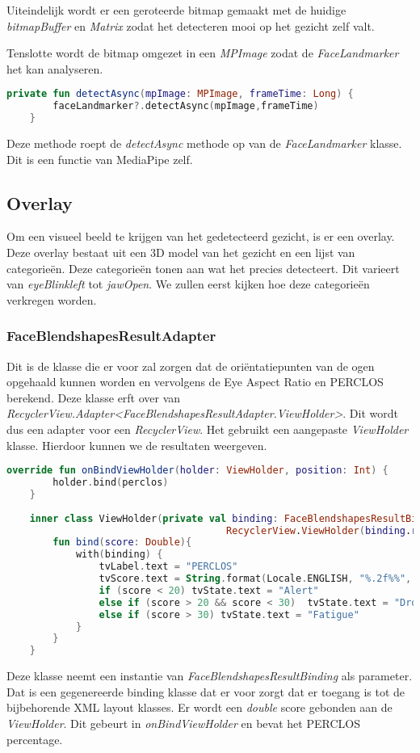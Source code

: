 Uiteindelijk wordt er een geroteerde bitmap gemaakt met de huidige \emph{bitmapBuffer} en \emph{Matrix} zodat het detecteren mooi op het gezicht zelf valt.

Tenslotte wordt de bitmap omgezet in een \emph{MPImage} zodat de \emph{FaceLandmarker} het kan analyseren.

\begin{lstlisting}[language=Kotlin, caption=detectAsync in FaceLandmarkerHelper.kt, label={lst:detectAsync}]
    private fun detectAsync(mpImage: MPImage, frameTime: Long) {
        faceLandmarker?.detectAsync(mpImage,frameTime)
    }
\end{lstlisting}
Deze methode roept de \emph{detectAsync} methode op van de \emph{FaceLandmarker} klasse. Dit is een functie van MediaPipe zelf.

\subsection{Overlay}
Om een visueel beeld te krijgen van het gedetecteerd gezicht, is er een overlay. Deze overlay bestaat uit een 3D model van het gezicht en een lijst van categorieën. Deze categorieën tonen aan wat het precies detecteert. Dit varieert van \emph{eyeBlinkleft} tot \emph{jawOpen}. We zullen eerst kijken hoe deze categorieën verkregen worden.

\subsubsection{FaceBlendshapesResultAdapter}
Dit is de klasse die er voor zal zorgen dat de oriëntatiepunten van de ogen opgehaald kunnen worden en vervolgens de Eye Aspect Ratio en PERCLOS berekend. Deze klasse erft over van \emph{RecyclerView.Adapter<FaceBlendshapesResultAdapter.ViewHolder>}. Dit wordt dus een adapter voor een \emph{RecyclerView}. Het gebruikt een aangepaste \emph{ViewHolder} klasse. Hierdoor kunnen we de resultaten weergeven.
\begin{lstlisting}[language=Kotlin, caption=ViewHolder klasse in FaceBlendshapesResultAdapter, label={lst:ViewHolder}]
    override fun onBindViewHolder(holder: ViewHolder, position: Int) {
        holder.bind(perclos)
    }
    
    inner class ViewHolder(private val binding: FaceBlendshapesResultBinding):
                                      RecyclerView.ViewHolder(binding.root) {
        fun bind(score: Double){
            with(binding) {
                tvLabel.text = "PERCLOS"
                tvScore.text = String.format(Locale.ENGLISH, "%.2f%%", score)
                if (score < 20) tvState.text = "Alert"
                else if (score > 20 && score < 30)  tvState.text = "Drowsy"
                else if (score > 30) tvState.text = "Fatigue"
            }
        }
    }
\end{lstlisting}
Deze klasse neemt een instantie van \emph{FaceBlendshapesResultBinding} als parameter. Dat is een gegenereerde binding klasse dat er voor zorgt dat er toegang is tot de bijbehorende XML layout klasses. Er wordt een \emph{double} score gebonden aan de \emph{ViewHolder}. Dit gebeurt in \emph{onBindViewHolder} en bevat het PERCLOS percentage.

